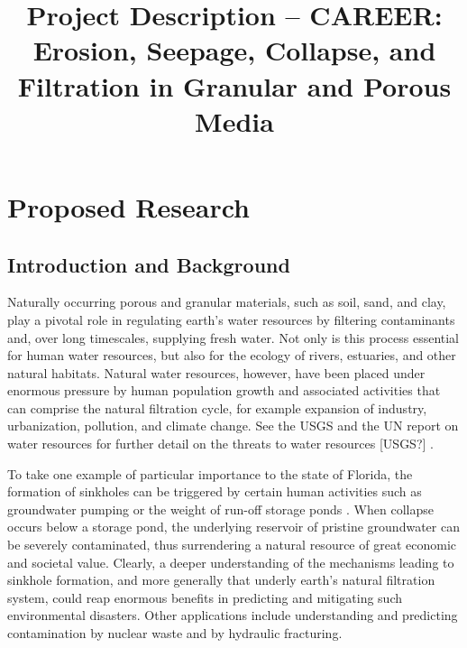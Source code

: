 \documentclass[12pt]{article}
\begin{document}
\title{Project Description --
CAREER: Erosion, Seepage, Collapse, and Filtration in Granular and Porous Media}

\date{}
\maketitle

\section{Proposed Research} 

\subsection{Introduction and Background} 

Naturally occurring porous and granular materials, such as soil, sand, and clay, play a pivotal role in regulating earth's water resources by filtering contaminants and, over long timescales, supplying fresh water. Not only is this process essential for human water resources, but also for the ecology of rivers, estuaries, and other natural habitats. Natural water resources, however, have been placed under enormous pressure by human population growth and associated activities that can comprise the natural filtration cycle, for example expansion of industry, urbanization, pollution, and climate change. See the USGS and the UN report on water resources for further detail on the threats to water resources [USGS?] \cite{UNwater}.

To take one example of particular importance to the state of Florida, the formation of sinkholes can be triggered by certain human activities such as groundwater pumping or the weight of run-off storage ponds \cite{sandhu2018fate}. When collapse occurs below a storage pond, the underlying reservoir of pristine groundwater can be severely contaminated, thus surrendering a natural resource of great economic and societal value. Clearly, a deeper understanding of the mechanisms leading to sinkhole formation, and more generally that underly earth's natural filtration system, could reap enormous benefits in predicting and mitigating such environmental disasters. Other applications include understanding and predicting contamination by nuclear waste and by hydraulic fracturing.
\end{document}

